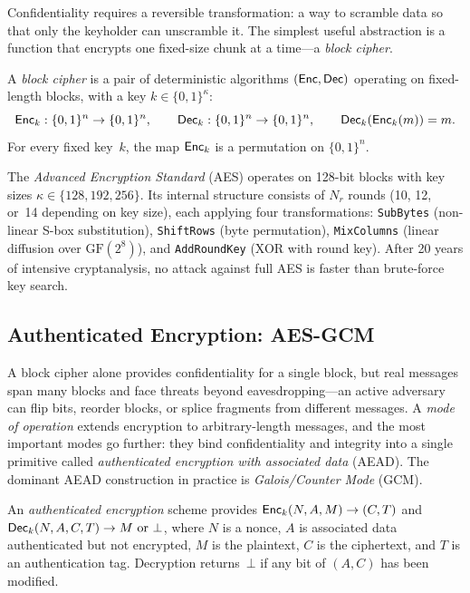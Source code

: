 Confidentiality requires a reversible transformation: a way to scramble data so that only the keyholder can unscramble it.  The simplest useful abstraction is a function that encrypts one fixed-size chunk at a time---a \emph{block cipher}.

\begin{definition}
\label{def:block-cipher}
A \emph{block cipher} is a pair of deterministic algorithms $(\mathsf{Enc}, \mathsf{Dec})$ operating on fixed-length blocks, with a key $k \in \{0,1\}^\kappa$:
\[
\mathsf{Enc}_k : \{0,1\}^n \to \{0,1\}^n, \qquad \mathsf{Dec}_k : \{0,1\}^n \to \{0,1\}^n, \qquad \mathsf{Dec}_k(\mathsf{Enc}_k(m)) = m.
\]
For every fixed key~$k$, the map $\mathsf{Enc}_k$ is a permutation on $\{0,1\}^n$.
\end{definition}

The \emph{Advanced Encryption Standard} (AES) operates on 128-bit blocks with key sizes $\kappa \in \{128, 192, 256\}$.  Its internal structure consists of $N_r$ rounds (10, 12, or~14 depending on key size), each applying four transformations: \texttt{SubBytes} (non-linear S-box substitution), \texttt{ShiftRows} (byte permutation), \texttt{MixColumns} (linear diffusion over $\mathrm{GF}(2^8)$), and \texttt{AddRoundKey} (XOR with round key).  After 20 years of intensive cryptanalysis, no attack against full AES is faster than brute-force key search.

\subsection{Authenticated Encryption: AES-GCM}
\label{subsec:aes-gcm}

A block cipher alone provides confidentiality for a single block, but real messages span many blocks and face threats beyond eavesdropping---an active adversary can flip bits, reorder blocks, or splice fragments from different messages.  A \emph{mode of operation} extends encryption to arbitrary-length messages, and the most important modes go further: they bind confidentiality and integrity into a single primitive called \emph{authenticated encryption with associated data} (AEAD).  The dominant AEAD construction in practice is \emph{Galois/Counter Mode} (GCM).

\begin{definition}
\label{def:aead}
An \emph{authenticated encryption} scheme provides $\mathsf{Enc}_k(N, A, M) \to (C, T)$ and $\mathsf{Dec}_k(N, A, C, T) \to M \text{ or } \bot$, where $N$ is a nonce, $A$ is associated data authenticated but not encrypted, $M$ is the plaintext, $C$ is the ciphertext, and $T$ is an authentication tag.  Decryption returns~$\bot$ if any bit of $(A, C)$ has been modified.
\end{definition}

